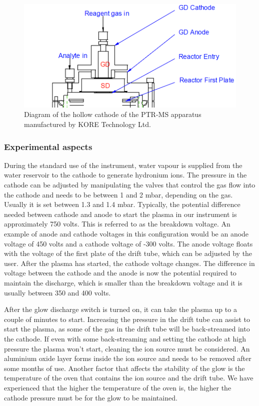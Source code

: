 \begin{figure}
\centering
\includegraphics[width=0.8\linewidth]{pics/cathode.PNG}
\centering
\caption{Diagram of the hollow cathode of the PTR-MS apparatus manufactured by KORE Technology Ltd.}
\label{fig:cathode}
\end{figure}

\subsubsection{Experimental aspects}
During the standard use of the instrument, water vapour is supplied from the water reservoir to the cathode to generate hydronium ions. The pressure in the cathode can be adjusted by manipulating the valves that control the gas flow into the cathode and needs to be between 1 and 2 mbar, depending on the gas. Usually it is set between 1.3 and 1.4 mbar. Typically, the potential difference needed between cathode and anode to start the plasma in our instrument is approximately 750 volts. This is referred to as the breakdown voltage. An example of anode and cathode voltages in this configuration would be an anode voltage of 450 volts and a cathode voltage of -300 volts. The anode voltage floats with the voltage of the first plate of the drift tube, which can be adjusted by the user. After the plasma has started, the cathode voltage changes. The difference in voltage between the cathode and the anode is now the potential required to maintain the discharge, which is smaller than the breakdown voltage and it is usually between 350 and 400 volts.

After the glow discharge switch is turned on, it can take the plasma up to a couple of minutes to start. Increasing the pressure in the drift tube can assist to start the plasma, as some of the gas in the drift tube will be back-streamed into the cathode. If even with some back-streaming and setting the cathode at high pressure the plasma won't start, cleaning the ion source must be considered. An aluminium oxide layer forms inside the ion source and needs to be removed after some months of use. Another factor that affects the stability of the glow is the temperature of the oven that contains the ion source and the drift tube. We have experienced that the higher the temperature of the oven is, the higher the cathode pressure must be for the glow to be maintained.

